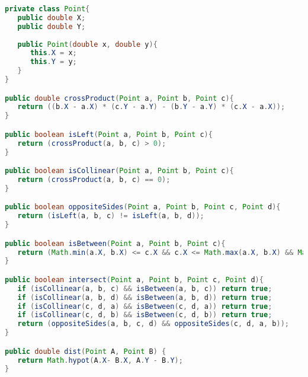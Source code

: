 \begin{lstlisting}[language=Java]
private class Point{
   public double X;
   public double Y;
	
   public Point(double x, double y){
      this.X = x;
      this.Y = y;
   }
}

public double crossProduct(Point a, Point b, Point c){
   return ((b.X - a.X) * (c.Y - a.Y) - (b.Y - a.Y) * (c.X - a.X));
}

public boolean isLeft(Point a, Point b, Point c){
   return (crossProduct(a, b, c) > 0);
}

public boolean isCollinear(Point a, Point b, Point c){
   return (crossProduct(a, b, c) == 0);
}

public boolean oppositeSides(Point a, Point b, Point c, Point d){
   return (isLeft(a, b, c) != isLeft(a, b, d));
}

public boolean isBetween(Point a, Point b, Point c){
   return (Math.min(a.X, b.X) <= c.X && c.X <= Math.max(a.X, b.X) && Math.min(a.Y, b.Y) <= c.Y && c.Y <= Math.max(a.Y,b.Y));
}

public boolean intersect(Point a, Point b, Point c, Point d){
   if (isCollinear(a, b, c) && isBetween(a, b, c)) return true;
   if (isCollinear(a, b, d) && isBetween(a, b, d)) return true;
   if (isCollinear(c, d, a) && isBetween(c, d, a)) return true;
   if (isCollinear(c, d, b) && isBetween(c, d, b)) return true;
   return (oppositeSides(a, b, c, d) && oppositeSides(c, d, a, b));
}

public double dist(Point A, Point B) {
   return Math.hypot(A.X- B.X, A.Y - B.Y);
}
\end{lstlisting}
